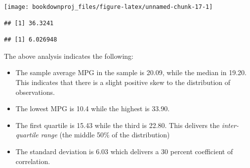 \documentclass[
]{book}
\newenvironment{Shaded}{\begin{snugshade}}{\end{snugshade}}
\newcommand{\AttributeTok}[1]{\textcolor[rgb]{0.77,0.63,0.00}{#1}}
\newcommand{\CommentTok}[1]{\textcolor[rgb]{0.56,0.35,0.01}{\textit{#1}}}
\newcommand{\DecValTok}[1]{\textcolor[rgb]{0.00,0.00,0.81}{#1}}
\newcommand{\FunctionTok}[1]{\textcolor[rgb]{0.00,0.00,0.00}{#1}}
\newcommand{\NormalTok}[1]{#1}
\newcommand{\SpecialCharTok}[1]{\textcolor[rgb]{0.00,0.00,0.00}{#1}}
\newcommand{\StringTok}[1]{\textcolor[rgb]{0.31,0.60,0.02}{#1}}
\begin{document}
\begin{Shaded}
\end{Shaded}

\begin{center}\texttt{[image: bookdownproj\_files/figure-latex/unnamed-chunk-17-1]} \end{center}

\begin{Shaded}
\end{Shaded}

\begin{verbatim}
## [1] 36.3241
\end{verbatim}

\begin{Shaded}
\end{Shaded}

\begin{verbatim}
## [1] 6.026948
\end{verbatim}

The above analysis indicates the following:

\begin{itemize}
\item
  The sample average MPG in the sample is 20.09, while the median in 19.20. This indicates that there is a slight positive skew to the distribution of observations.
\item
  The lowest MPG is 10.4 while the highest is 33.90.
\item
  The first quartile is 15.43 while the third is 22.80. This delivers the \emph{inter-quartile range} (the middle 50\% of the distribution)
\item
  The standard deviation is 6.03 which delivers a 30 percent coefficient of correlation.
\end{itemize}
\end{document}
